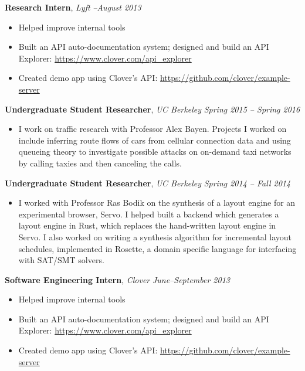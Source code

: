 \documentclass[9pt]{article}
\newenvironment{changemargin}[2]{%
  \begin{list}{}{%
      \setlength{\topsep}{0pt}%
      \setlength{\leftmargin}{#1}%
      \setlength{\rightmargin}{#2}%
      \setlength{\listparindent}{\parindent}%
      \setlength{\itemindent}{\parindent}%
      \setlength{\parsep}{\parskip}%
    }%
  \item[]}{\end{list}
}
\newenvironment{body} {
  \vspace*{-16pt}
  \begin{changemargin}{-0.25in}{-0.5in}
  }
  {\end{changemargin}
}
\begin{document}
\begin{body}
  \vspace{14pt}

  \textbf{Research Intern}, \emph{Lyft} \hfill \emph{--August 2013}\\
  \vspace*{-4pt}
  \begin{itemize} \itemsep -0pt  %
  \item Helped improve internal tools
  \item Built an API auto-documentation system; designed and build an API     Explorer: \url{https://www.clover.com/api_explorer}
  \item Created demo app using Clover's API:     \url{https://github.com/clover/example-server}
  \end{itemize}

  \textbf{Undergraduate Student Researcher}, \emph{UC Berkeley} \hfill \emph{Spring 2015 -- Spring 2016}\\
  \vspace*{-4pt}
  \begin{itemize} \itemsep -0pt  %
  \item I work on traffic research with Professor Alex Bayen. Projects I worked
    on include inferring route flows of cars from cellular connection data and
    using queueing theory to investigate possible attacks on on-demand taxi
    networks by calling taxies and then canceling the calls.
  \end{itemize}

  \textbf{Undergraduate Student Researcher}, \emph{UC Berkeley} \hfill \emph{Spring 2014 -- Fall 2014}\\
  \vspace*{-4pt}
  \begin{itemize} \itemsep -0pt  %
  \item I worked with Professor Ras Bodik on the synthesis of a layout engine
    for an experimental browser, Servo. I helped built a backend which generates
    a layout engine in Rust, which replaces the hand-written layout engine in
    Servo. I also worked on writing a synthesis algorithm for incremental layout
    schedules, implemented in Rosette, a domain specific language for
    interfacing with SAT/SMT solvers.
  \end{itemize}

  \textbf{Software Engineering Intern}, \emph{Clover} \hfill \emph{June--September 2013}\\
  \vspace*{-4pt}
  \begin{itemize} \itemsep -0pt  %
  \item Helped improve internal tools
  \item Built an API auto-documentation system; designed and build an API     Explorer: \url{https://www.clover.com/api_explorer}
  \item Created demo app using Clover's API:     \url{https://github.com/clover/example-server}
  \end{itemize}


\end{body}
\end{document}
